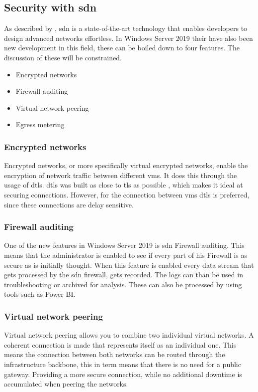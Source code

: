 \subsection{Security with \acrfull{sdn}}
As described by \textcite{Shin2016}, \acrfull{sdn} is a state-of-the-art technology that enables developers to design advanced networks effortless. In Windows Server 2019 their have also been new development in this field, these can be boiled down to four features. The discussion of these will be constrained.
\begin{itemize}
	\item Encrypted networks
	\item Firewall auditing
	\item Virtual network peering
	\item Egress metering
\end{itemize} 

\subsubsection{Encrypted networks}
Encrypted networks, or more specifically virtual encrypted networks, enable the encryption of network traffic between different \acrlong{vm}s. It does this through the usage of \acrfull{dtls}. \acrshort{dtls} was built as close to \acrshort{tls} as possible \autocite{Modadugu2003}, which makes it ideal at securing connections. However, for the connection between \acrlong{vm}s \acrshort{dtls} is preferred, since these connections are delay sensitive. 
\subsubsection{Firewall auditing}
One of the new features in Windows Server 2019 is \acrshort{sdn} Firewall auditing. This means that the administrator is enabled to see if every part of his Firewall is as secure as is initially thought. When this feature is enabled every data stream that gets processed by the \acrshort{sdn} firewall, gets recorded. The logs can than be used in troubleshooting or archived for analysis. These can also be processed by using tools such as Power BI.
\subsubsection{Virtual network peering}
Virtual network peering allows you to combine two individual virtual networks. A coherent connection is made that represents itself as an individual one. This means the connection between both networks can be routed through the infrastructure backbone, this in term means that there is no need for a public gateway. Providing a more secure connection, while no additional downtime is accumulated when peering the networks.

